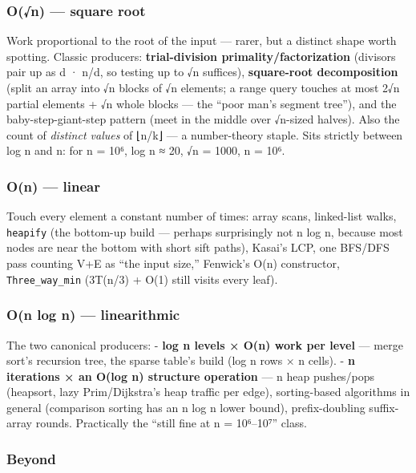 \documentclass[
  10pt,
  letterpaper,
  onecolumn]{article}
\begin{document}
\hypertarget{on-square-root}{%
\subsubsection{O(√n) --- square root}\label{on-square-root}}

Work proportional to the root of the input --- rarer, but a distinct
shape worth spotting. Classic producers: \textbf{trial-division
primality/factorization} (divisors pair up as d · n/d, so testing up to
√n suffices), \textbf{square-root decomposition} (split an array into √n
blocks of √n elements; a range query touches at most 2√n partial
elements + √n whole blocks --- the ``poor man's segment tree''), and the
baby-step-giant-step pattern (meet in the middle over √n-sized halves).
Also the count of \emph{distinct values} of ⌊n/k⌋ --- a number-theory
staple. Sits strictly between log n and n: for n = 10⁶, log n ≈ 20, √n =
1000, n = 10⁶.

\hypertarget{on-linear}{%
\subsubsection{O(n) --- linear}\label{on-linear}}

Touch every element a constant number of times: array scans, linked-list
walks, \texttt{heapify} (the bottom-up build --- perhaps surprisingly
not n log n, because most nodes are near the bottom with short sift
paths), Kasai's LCP, one BFS/DFS pass counting V+E as ``the input
size,'' Fenwick's O(n) constructor, \texttt{Three\_way\_min} (3T(n/3) +
O(1) still visits every leaf).

\hypertarget{on-log-n-linearithmic}{%
\subsubsection{O(n log n) ---
linearithmic}\label{on-log-n-linearithmic}}

The two canonical producers: - \textbf{log n levels × O(n) work per
level} --- merge sort's recursion tree, the sparse table's build (log n
rows × n cells). - \textbf{n iterations × an O(log n) structure
operation} --- n heap pushes/pops (heapsort, lazy Prim/Dijkstra's heap
traffic per edge), sorting-based algorithms in general (comparison
sorting has an n log n lower bound), prefix-doubling suffix-array
rounds. Practically the ``still fine at n = 10⁶--10⁷'' class.

\hypertarget{beyond}{%
\subsubsection{Beyond}\label{beyond}}
\end{document}
